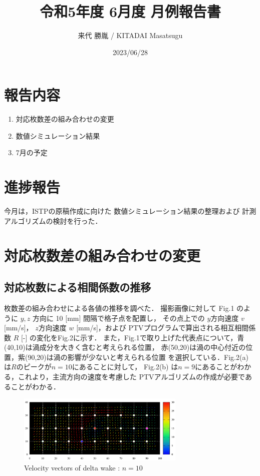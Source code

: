 \documentclass[twocolumn,a4j]{jsarticle}
\author{来代 勝胤 / KITADAI Masatsugu}
\title{令和5年度 6月度 月例報告書}
\date{2023/06/28}
\begin{document}
\columnseprule=0.1mm
\maketitle

\section*{報告内容}
\begin{enumerate}[1.]
  \item 対応枚数差の組み合わせの変更
  \item 数値シミュレーション結果
  \item 7月の予定
\end{enumerate}

\section*{進捗報告}
今月は，ISTPの原稿作成に向けた
数値シミュレーション結果の整理および
計測アルゴリズムの検討を行った．

\section{対応枚数差の組み合わせの変更}
\subsection{対応枚数による相間係数の推移}
枚数差の組み合わせによる各値の推移を調べた．
撮影画像に対して Fig.1 のように $y,z$ 方向に 10 [mm] 間隔で格子点を配置し，
その点上での $y$方向速度 $v$ [mm/s]， $z$方向速度 $w$ [mm/s]，および
PTVプログラムで算出される相互相間係数 $R$ [-] の変化をFig.2に示す．
また，Fig.1で取り上げた代表点について，青(40,10)は渦成分を大きく含むと考えられる位置，
赤(50,20)は渦の中心付近の位置，紫(90,20)は渦の影響が少ないと考えられる位置
を選択している．Fig.2(a) は$R$のピークが$n=10$にあることに対して，
Fig.2(b) は$n=9$にあることがわかる，これより，主流方向の速度を考慮した
PTVアルゴリズムの作成が必要であることがわかる．\\

\begin{figure}[htbp]
  \footnotesize
  \begin{center}
    \includegraphics[width=80mm]{../images/vector_grid.png}
    \caption{Velocity vectors of delta wake : $n = 10$}
  \end{center}
\end{figure}
\end{document}
